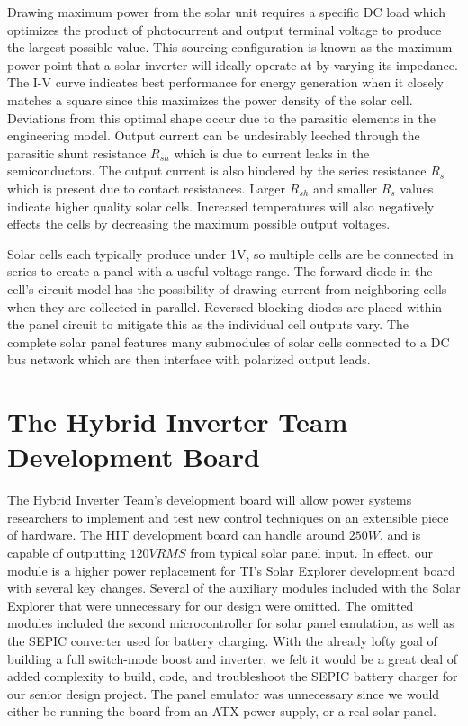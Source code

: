 Drawing maximum power from the solar unit requires a specific DC load which optimizes the product of photocurrent and output terminal voltage to produce the largest possible value. This sourcing configuration is known as the maximum power point that a solar inverter will ideally operate at by varying its impedance. The I-V curve indicates best performance for energy generation when it closely matches a square since this maximizes the power density of the solar cell. Deviations from this optimal shape occur due to the parasitic elements in the engineering model. Output current can be undesirably leeched through the parasitic shunt resistance $R_{sh}$ which is due to current leaks in the semiconductors. The output current is also hindered by the series resistance $R_{s}$ which is present due to contact resistances. Larger $R_{sh}$ and smaller $R_{s}$ values indicate higher quality solar cells. Increased temperatures will also negatively effects the cells by decreasing the maximum possible output voltages.

Solar cells each typically produce under 1V, so multiple cells are be connected in series to create a panel with a useful voltage range. The forward diode in the cell's circuit model has the possibility of drawing current from neighboring cells when they are collected in parallel. Reversed blocking diodes are placed within the panel circuit to mitigate this as the individual cell outputs vary. The complete solar panel features many submodules of solar cells connected to a DC bus network which are then interface with polarized output leads.

\section{The Hybrid Inverter Team Development Board}
The Hybrid Inverter Team's development board will allow power systems researchers to implement and test new control techniques on an extensible piece of hardware. The HIT development board can handle around $250W$, and is capable of outputting $120VRMS$ from typical solar panel input. In effect, our module is a higher power replacement for TI's Solar Explorer development board with several key changes. Several of the auxiliary modules included with the Solar Explorer that were unnecessary for our design were omitted. The omitted modules included the second microcontroller for solar panel emulation, as well as the SEPIC converter used for battery charging. With the already lofty goal of building a full switch-mode boost and inverter, we felt it would be a great deal of added complexity to build, code, and troubleshoot the SEPIC battery charger for our senior design project. The panel emulator was unnecessary since we would either be running the board from an ATX power supply, or a real solar panel.

